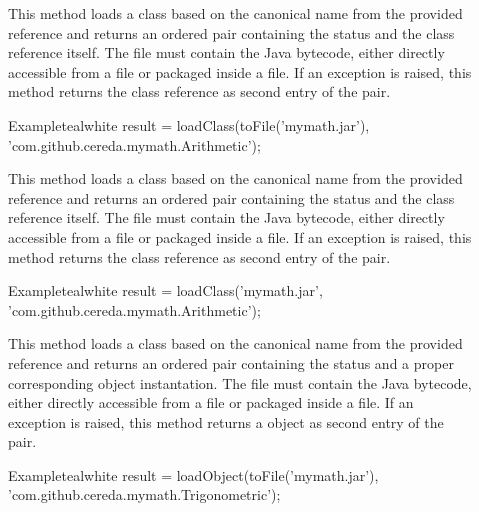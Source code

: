 \begin{description}
\item[] This method loads a class based on the canonical name from the provided  reference and returns an ordered pair containing the status and the class reference itself. The file must contain the Java bytecode, either directly accessible from a  file or packaged inside a  file. If an exception is raised, this method returns the  class reference as second entry of the pair.

\begin{codebox}{Example}{teal}{\icnote}{white}
result = loadClass(toFile('mymath.jar'),
         'com.github.cereda.mymath.Arithmetic');
\end{codebox}

\item[] This method loads a class based on the canonical name from the provided  reference and returns an ordered pair containing the status and the class reference itself. The file must contain the Java bytecode, either directly accessible from a  file or packaged inside a  file.  If an exception is raised, this method returns the  class reference as second entry of the pair.

\begin{codebox}{Example}{teal}{\icnote}{white}
result = loadClass('mymath.jar',
         'com.github.cereda.mymath.Arithmetic');
\end{codebox}

\item[] This method loads a class based on the canonical name from the provided  reference and returns an ordered pair containing the status and a proper corresponding object instantation. The file must contain the Java bytecode, either directly accessible from a  file or packaged inside a  file. If an exception is raised, this method returns a  object as second entry of the pair.

\begin{codebox}{Example}{teal}{\icnote}{white}
result = loadObject(toFile('mymath.jar'),
         'com.github.cereda.mymath.Trigonometric');
\end{codebox}


\end{description}
